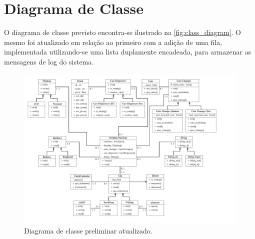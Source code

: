 %
%
%
%
%

%
%
%
%
%

\section{Diagrama de Classe} \label{sec:class_diagrams}

O diagrama de classe previsto encontra-se ilustrado na \autoref{fig:class_diagram}. O mesmo foi atualizado em relação ao primeiro com a adição de uma fila, implementada utilizando-se uma lista duplamente encadeada, para armazenar as mensagens de log do sistema.

\begin{figure}[!ht]
    \begin{center}
        \includegraphics[width=\columnwidth]{figures/class_diagram.pdf}
        \caption{Diagrama de classe preliminar atualizado.}
        \label{fig:class_diagram}
    \end{center}
\end{figure}
